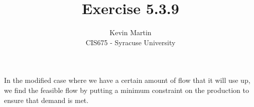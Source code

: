 \documentclass{article}
\author{Kevin Martin\\ CIS675 - Syracuse University}
\title{Exercise 5.3.9}
\begin{document}
\maketitle
In the modified case where we have a certain amount of flow that 
it will use up, we find the feasible flow by putting a minimum
constraint on the production to ensure that demand is met.
\end{document}
